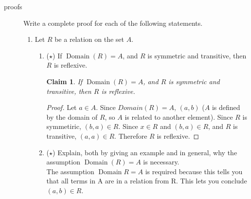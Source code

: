 \documentclass[11pt]{letter}
\newtheorem{claim}{Claim}
\theoremstyle{definition}
\begin{document}
\begin{description}
\item[proofs] Write a complete proof for each of the following statements.
\begin{enumerate}
	\item Let $R$ be a relation on the set $A$.
				\begin{enumerate}
				\item  ($\star$) If $\operatorname{Domain}(R)=A$, and $R$ is symmetric and transitive, then $R$ is reflexive.
                                  \begin{claim}
                                    If $\operatorname{Domain}(R)=A$, and $R$ is symmetric and transitive, then $R$ is reflexive.
                                  \end{claim}
                                  \begin{proof}
                                    Let $a\in A$. Since $Domain(R)=A$, $(a,b)$ ($A$ is defined by the domain of $R$, so $A$ is related to another element). Since $R$ is symmetiric, $(b,a)\in R$. Since $x\in R$ and $(b,a)\in R$, and $R$ is transitive, $(a,a)\in R$. Therefore $R$ is reflexive.
                                  \end{proof}
                                  
				\item ($\star$) Explain, both by giving an example and in general, why the assumption $\operatorname{Domain}(R)=A$ is necessary.\\
                                  The assumption $\operatorname{Domain}{R}=A$ is required because this tells you that all terms in A are in a relation from R. This lets you conclude $(a,b)\in R$.
				\end{enumerate}
			

\end{enumerate}
\end{description}
\end{document}
